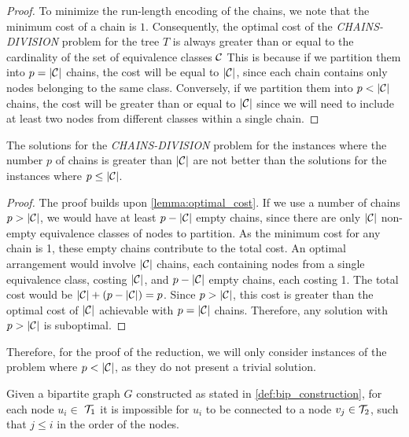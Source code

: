 \begin{proof}
    To minimize the run-length encoding of the chains, we note that the minimum cost of a chain is $1$. Consequently, the optimal cost of the \textit{CHAINS-DIVISION} problem for the tree $T$ is always greater than or equal to the cardinality of the set of equivalence classes $\mathcal{C}$ This is because if we partition them into $p = |\mathcal{C}|$ chains, the cost will be equal to $|\mathcal{C}|$, since each chain contains only nodes belonging to the same class. Conversely, if we partition them into $p < |\mathcal{C}|$ chains, the cost will be greater than or equal to $|\mathcal{C}|$ since we will need to include at least two nodes from different classes within a single chain.
\end{proof}

\begin{claim} \label{claim:p_less_than_E}
    The solutions for the \textit{CHAINS-DIVISION} problem for the instances where the number $p$ of chains is greater than $|\mathcal{C}|$ are not better than the solutions for the instances where $p \leq |\mathcal{C}|$.
\end{claim}

\begin{proof}
    The proof builds upon \cref{lemma:optimal_cost}. If we use a number of chains $p > |\mathcal{C}|$, we would have at least $p - |\mathcal{C}|$ empty chains, since there are only $|\mathcal{C}|$ non-empty equivalence classes of nodes to partition. As the minimum cost for any chain is 1, these empty chains contribute to the total cost. An optimal arrangement would involve $|\mathcal{C}|$ chains, each containing nodes from a single equivalence class, costing $|\mathcal{C}|$, and $p - |\mathcal{C}|$ empty chains, each costing 1. The total cost would be $|\mathcal{C}| + (p - |\mathcal{C}|) = p$. Since $p > |\mathcal{C}|$, this cost is greater than the optimal cost of $|\mathcal{C}|$ achievable with $p = |\mathcal{C}|$ chains. Therefore, any solution with $p > |\mathcal{C}|$ is suboptimal.
\end{proof}

Therefore, for the proof of the reduction, we will only consider instances of the problem where $p < |\mathcal{C}|$, as they do not present a trivial solution.

\begin{lemma} \label{lemma:greater_nodes}
    Given a bipartite graph $G$ constructed as stated in \cref{def:bip_construction}, for each node $u_i \in$ $\mathcal{T}_{1}$ it is impossible for $u_i$ to be connected to a node $v_j \in \mathcal{T}_{2}$, such that $j \leq i$ in the order of the nodes.
\end{lemma}

